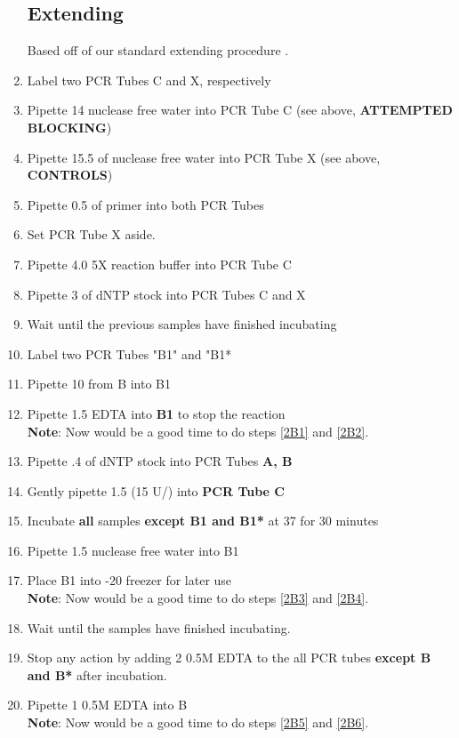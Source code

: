 \documentclass{ssiBio}
\begin{document}
\begin{enumerate}
\subsection{Extending}
Based off of our standard \tdt{} extending procedure \cite{genTdT}.
\item{Label two PCR Tubes C and X, respectively}
\item{Pipette 14\uL{} nuclease free water into PCR Tube C (see above, \textbf{ATTEMPTED BLOCKING})}
\item{Pipette 15.5\uL{} of nuclease free water into PCR Tube X (see above, \textbf{CONTROLS})}
\item{Pipette 0.5\uL{} of primer into both PCR Tubes}
\item{Set PCR Tube X aside.}
\item{Pipette 4.0\uL{} 5X \tdt{} reaction buffer into PCR Tube C}
\item{Pipette 3\uL{} of dNTP stock into PCR Tubes C and X}
\item{Wait until the previous samples have finished incubating}
\item{Label two PCR Tubes "B1" and "B1*}
\item{Pipette 10\uL{} from B into B1}
\item{Pipette 1.5\uL{} EDTA into \textbf{B1} to stop the reaction \cite{Invitrogen2002}}\\
	\textbf{Note}: Now would be a good time to do steps \ref{2B1} and \ref{2B2}.
\item{Pipette .4\uL{} of dNTP stock into PCR Tubes \textbf{A, B}}
\item{Gently pipette 1.5\uL{} \tdt{} (15 U/\uL{}) into \textbf{PCR Tube C}}
\item{Incubate \textbf{all} samples \textbf{except B1 and B1*} at 37\C{} for 30 minutes}
\item{Pipette 1.5\uL{} nuclease free water into B1}
\item{Place B1 into -20\C{} freezer for later use}\\
	\textbf{Note}: Now would be a good time to do steps \ref{2B3} and \ref{2B4}.
\item{Wait until the samples have finished incubating.}
\item{Stop any \tdt action by adding 2\uL{} 0.5M EDTA to the all PCR tubes \textbf{except B and B*} after incubation.\cite{Invitrogen2002}}
\item{Pipette 1\uL{} 0.5M EDTA into B}\\
\textbf{Note}: Now would be a good time to do steps \ref{2B5} and \ref{2B6}.


\end{enumerate}
\end{document}

